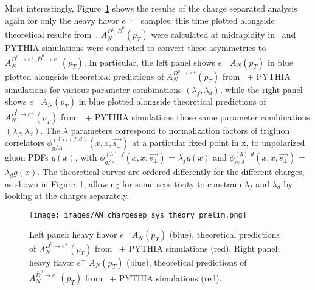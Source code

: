 \documentclass[submission, Proceedings]{SciPost}
\begin{document}
\noindent Most interestingly, Figure~\ref{fig:AN_chargesep_theory} shows the results of the charge separated analysis again for only the heavy flavor $e^{+,-}$ samples, this time plotted alongside theoretical results from~\cite{trigluon_twists}. $A_{N}^{D^{0},\bar{D}^{0}}(p_{T})$ were calculated at midrapidity in~\cite{trigluon_twists} and PYTHIA simulations were conducted to convert these asymmetries to $A_{N}^{D^{0}\rightarrow e^{+},\bar{D}^{0} \rightarrow e^{-}} (p_{T})$. In particular, the left panel shows $e^{+}$ $A_{N}(p_{T})$ in blue plotted alongside theoretical predictions of $A_{N}^{D^{0}\rightarrow e^{+}}(p_{T})$ from~\cite{trigluon_twists} + PYTHIA simulations for various parameter combinations $(\lambda_{f}, \lambda_{d})$, while the right panel shows $e^{-}$ $A_{N}(p_{T})$ in blue plotted alongside theoretical predictions of $A_{N}^{\bar{D}^{0}\rightarrow e^{-}}(p_{T})$ from~\cite{trigluon_twists} + PYTHIA simulations those same parameter combinations $(\lambda_{f}, \lambda_{d})$. The $\lambda$ parameters correspond to normalization factors of trigluon correlators $\phi^{(3),(f,d)}_{g/A} (x,x,\vec{s_{\perp}})$ at a particular fixed point in x, to unpolarized gluon PDFs $g(x)$, with $\phi^{(3),f}_{g/A} (x,x,\vec{s_{\perp}})$ = $\lambda_{f} g(x)$ and $\phi^{(3),d}_{g/A} (x,x,\vec{s_{\perp}})$ = $\lambda_{d} g(x)$. The theoretical curves are ordered differently for the different charges, as shown in Figure~\ref{fig:AN_chargesep_theory}, allowing for some sensitivity to constrain $\lambda_{f}$ and $\lambda_{d}$ by looking at the charges separately.
\begin{figure}[H]
    \centering
    \texttt{[image: images/AN\_chargesep\_sys\_theory\_prelim.png]}
    \caption{Left panel: heavy flavor $e^{+}$ $A_{N}(p_{T})$ (blue), theoretical predictions of $A_{N}^{D^{0}\rightarrow e^{+}}(p_{T})$ from~\cite{trigluon_twists} + PYTHIA simulations (red). Right panel: heavy flavor $e^{-}$ $A_{N}(p_{T})$ (blue), theoretical predictions of $A_{N}^{\bar{D}^{0}\rightarrow e^{-}}(p_{T})$ from~\cite{trigluon_twists} + PYTHIA simulations (red). }\label{fig:AN_chargesep_theory}
\end{figure}
\end{document}
